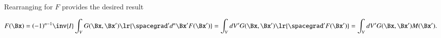 Rearranging for \( F \) provides the desired result

\begin{dmath}\label{eqn:gradientGreensFunctionEuclidean:280}
F(\Bx)
=
(-1)^{n-1} \inv{I}
\int_V G(\Bx,\Bx') \lr{ \spacegrad' d^n \Bx' F(\Bx') }
=
\int_V dV' G(\Bx,\Bx') \lr{ \spacegrad' F(\Bx') }
=
\int_V dV' G(\Bx,\Bx') M(\Bx').
\end{dmath}
